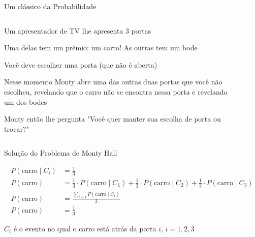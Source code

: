 \begin{frame}{Um clássico da Probabilidade}
    \begin{columns}
        \begin{column}{0.6\textwidth}
            \begin{exemplo}
            \begin{vfilleditems}
                \small
                \item Um apresentador de TV lhe apresenta 3 portas
                \item Uma delas tem um prêmio: um carro! As outras tem um bode
                \item Você deve escolher uma porta (que não é aberta)
                \item Nesse momento Monty abre uma das outras duas portas que você
                não escolheu, revelando que o carro não se encontra nessa porta e revelando um dos bodes
                \item Monty então lhe pergunta "Você quer manter sua escolha de porta ou trocar?"
            \end{vfilleditems}
        \end{exemplo}
        \end{column}
        \begin{column}{0.4\textwidth}
            \begin{figure}
                \centering
                \def\svgwidth{\columnwidth}
                
            \end{figure}
        \end{column}
    \end{columns}
\end{frame}

\begin{frame}{Solução do Problema de Monty Hall}
    \begin{idea}
    $$
        \begin{aligned}
    P(\text{carro} \mid C_i) &= \frac{1}{3} \\
    P(\text{carro}) &= \frac{1}{3} \cdot P(\text{carro} \mid C_1) + \frac{1}{3} \cdot P(\text{carro} \mid C_2) + \frac{1}{3} \cdot P(\text{carro} \mid C_3) \\
    P(\text{carro}) &= \frac{\sum^3_{i=1}P(\text{carro} \mid C_i)}{3} \\
    P(\text{carro}) &= \frac{1}{3}
    \end{aligned}
    $$
    \end{idea}
    \vfill \vfill
    $C_i$ é o evento no qual o carro está atrás da porta $i$, $i=1,2,3$
\end{frame}

